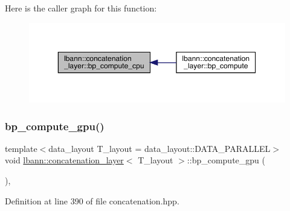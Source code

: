 Here is the caller graph for this function\+:\nopagebreak
\begin{figure}[H]
\begin{center}
\leavevmode
\includegraphics[width=350pt]{classlbann_1_1concatenation__layer_a530ff478d02f3d69baf8432473979d00_icgraph}
\end{center}
\end{figure}
\mbox{\label{classlbann_1_1concatenation__layer_aa024e4ba8d10aec75c89075e6e0cc28d}} 
\subsubsection{\texorpdfstring{bp\+\_\+compute\+\_\+gpu()}{bp\_compute\_gpu()}}
{\footnotesize\ttfamily template$<$data\+\_\+layout T\+\_\+layout = data\+\_\+layout\+::\+D\+A\+T\+A\+\_\+\+P\+A\+R\+A\+L\+L\+EL$>$ \\
void \hyperlink{classlbann_1_1concatenation__layer}{lbann\+::concatenation\+\_\+layer}$<$ T\+\_\+layout $>$\+::bp\+\_\+compute\+\_\+gpu (\begin{DoxyParamCaption}{ }\end{DoxyParamCaption})\hspace{0.3cm}{\ttfamily [inline]}, {\ttfamily [protected]}}



Definition at line 390 of file concatenation.\+hpp.


